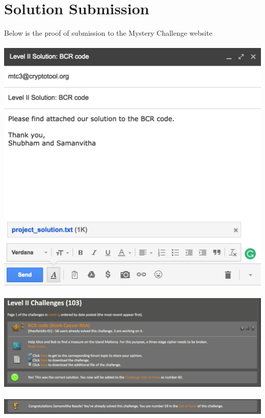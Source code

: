 \documentclass[12pt]{article}
\begin{document}
\section{Solution Submission}
Below is the proof of submission to the Mystery Challenge website \\ \\
\includegraphics[scale=0.8]{submission} \\ \\
\includegraphics[scale=0.5]{proof1} \\ \\
\includegraphics[scale=0.5]{proof2} \\ \\


\end{document}
